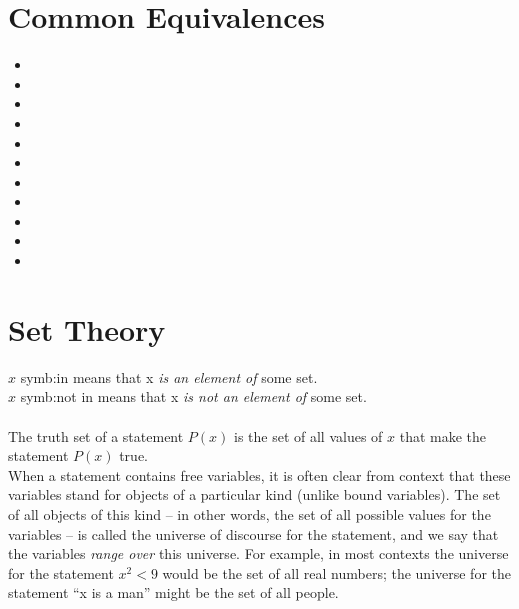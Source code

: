 \documentclass{article}
\begin{document}
\section{Common Equivalences}
\begin{itemize}
	\item {}
	\item {}
	\item {}
	\item {}
    \item {}
    \item {}
    \item {}
    \item {}
    \item {}
    \item {}
    \item {}
\end{itemize}

\section{Set Theory}
\noindent $x$ \gls{symb:in} means that x \textit{is an element of} some set.\\
\noindent $x$ \gls{symb:not in} means that x \textit{is not an element of} some set.\\\\
The \gls{truth set} of a statement $P(x)$ is the set of all values of $x$ that make the statement $P(x)$ true.\\
When a statement contains \glspl{free variable}, it is often clear from context that these variables stand for objects of a particular kind (unlike \glspl{bound variable}). The set of all objects of this kind – in other words, the set of all possible values for the variables – is called the \gls{universe of discourse} for the statement, and we say that the variables \textit{range over} this universe. For example, in most contexts the universe for the statement $x^2 < 9$ would be the set of all real numbers; the universe for the statement “x is a man” might be the set of all people.
\end{document}
